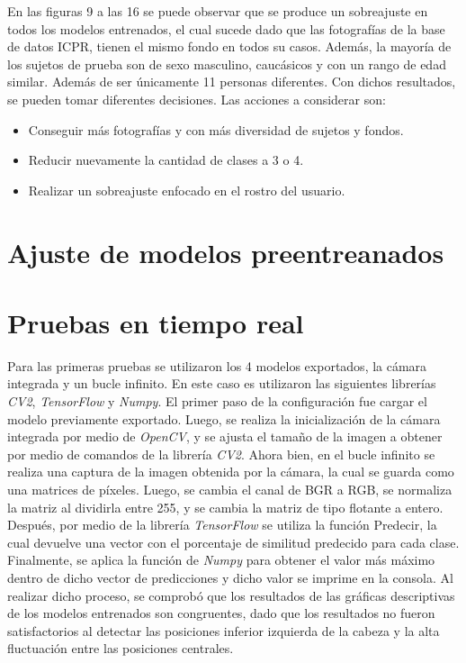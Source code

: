 En las figuras 9 a las 16 se puede observar que se produce un sobreajuste en todos los modelos entrenados, el cual sucede dado que las fotografías de la base de datos ICPR, tienen el mismo fondo en todos su casos. Además, la mayoría de los sujetos de prueba son de sexo masculino, caucásicos y con un rango de edad similar. Además de ser únicamente 11 personas diferentes. Con dichos resultados, se pueden tomar diferentes decisiones. Las acciones a considerar son: 

\begin{itemize}
	\item Conseguir más fotografías y con más diversidad de sujetos y fondos.
	\item Reducir nuevamente la cantidad de clases a 3 o 4. 
	\item Realizar un sobreajuste enfocado en el rostro del usuario.
\end{itemize}


\section{Ajuste de modelos preentreanados}
\section{Pruebas en tiempo real}

Para las primeras pruebas se utilizaron los 4 modelos exportados, la cámara integrada y un bucle infinito. En este caso es utilizaron las siguientes librerías \textit{CV2}, \textit{TensorFlow} y \textit{Numpy}. El primer paso de la configuración fue cargar el modelo previamente exportado. Luego, se realiza la inicialización de la cámara integrada por medio de \textit{OpenCV}, y se ajusta el tamaño de la imagen a obtener por medio de comandos de la librería \textit{CV2}. 
Ahora bien, en el bucle infinito se realiza una captura de la imagen obtenida por la cámara, la cual se guarda como una matrices de píxeles. Luego, se cambia el canal de BGR a RGB, se normaliza la matriz al dividirla entre 255, y se cambia la matriz de tipo flotante a entero. Después, por medio de la librería \textit{TensorFlow} se utiliza la función Predecir, la cual devuelve una vector con el porcentaje de similitud predecido para cada clase. Finalmente, se aplica la función de \textit{Numpy} para obtener el valor más máximo dentro de dicho vector de predicciones y dicho valor se imprime en la consola.
Al realizar dicho proceso, se comprobó que los resultados de las gráficas descriptivas de los modelos entrenados son congruentes, dado que los resultados no fueron satisfactorios al detectar las posiciones inferior izquierda de la cabeza y la alta fluctuación entre las posiciones centrales.

